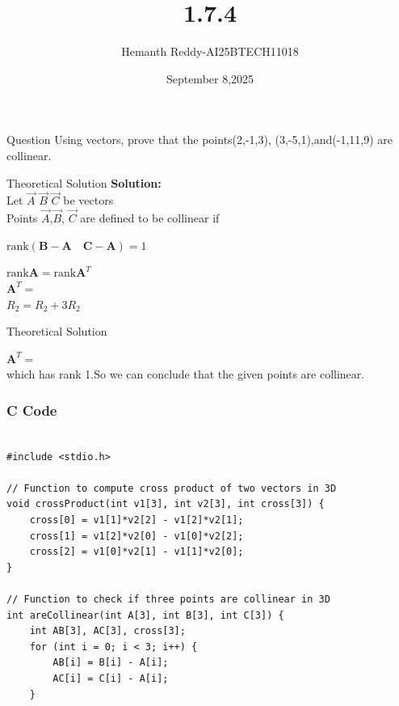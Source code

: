 \documentclass{beamer}
\title %
{1.7.4}
\date{September 8,2025}
\author %
{Hemanth Reddy-AI25BTECH11018}
\begin{document}
\frame{\titlepage}
\begin{frame}{Question}
Using vectors, prove that the points(2,-1,3), (3,-5,1),and(-1,11,9) are collinear.
\end{frame}



\begin{frame}{Theoretical Solution}
\textbf{Solution:}\\


Let $\vec{A}$   $\vec{B}$    $\vec{C}$ be vectors \\
Points $\vec{A}$,$\vec{B}$, $\vec{C}$ are defined to be collinear if\\
\begin{center}
    
$
\text{rank}\left(\textbf{B} - \textbf{A} \quad \textbf{C} - \textbf{A}\right) = 1
$

$
\text{rank} \textbf{A} = \text{rank} \textbf{A}^{T}
$\\
\vspace{0.5cm}
$\textbf{A}^{T}=$\\
\vspace{0.4cm}
$R_{2} = R_{2} + 3R_{2}$\\
\vspace{0.4cm}

\end{center}

\end{frame}

\begin{frame}{Theoretical Solution}


$\textbf{A}^{T}=$\\
\vspace{0.4cm}
 which has rank 1.So we can conclude that the given points are collinear.

\end{frame}


\begin{frame}[fragile]
    \frametitle{C Code }
    \begin{lstlisting}

#include <stdio.h>

// Function to compute cross product of two vectors in 3D
void crossProduct(int v1[3], int v2[3], int cross[3]) {
    cross[0] = v1[1]*v2[2] - v1[2]*v2[1];
    cross[1] = v1[2]*v2[0] - v1[0]*v2[2];
    cross[2] = v1[0]*v2[1] - v1[1]*v2[0];
}

// Function to check if three points are collinear in 3D
int areCollinear(int A[3], int B[3], int C[3]) {
    int AB[3], AC[3], cross[3];
    for (int i = 0; i < 3; i++) {
        AB[i] = B[i] - A[i];
        AC[i] = C[i] - A[i];
    }


    \end{lstlisting}
\end{frame}
\end{document}
